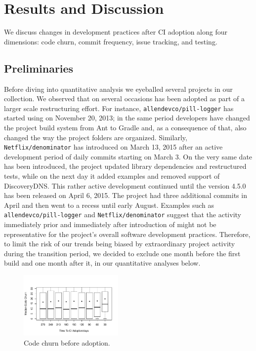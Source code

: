 
\section{Results and Discussion}

We discuss changes in development practices after CI adoption along four 
dimensions: code churn, commit frequency, issue tracking, and testing. 

\subsection{Preliminaries}
\label{sec:examples}

Before diving into quantitative analysis we eyeballed several projects in our 
collection. 
We observed that on several occasions \Tvis has been adopted as part of a 
larger scale restructuring effort. 
For instance, \texttt{allendevco/pill-logger} has started using \Tvis on November 
20, 2013; in the same period developers have changed the project build system 
from Ant to Gradle and, as a consequence of that, also changed the way the 
project folders are organized.
Similarly, \texttt{Netflix/denominator} has introduced \Tvis on March 13, 2015
after an active development period of daily commits starting on March 3.
On the very same date \Tvis has been introduced, the project updated library 
dependencies and restructured tests, while on the next day it added examples 
and removed support of DiscoveryDNS.
This rather active development continued until the version 4.5.0 has been 
released on April 6, 2015.
The project had three additional commits in April and then went to a recess 
until early August. 
Examples such as \texttt{allendevco/pill-logger} and \texttt{Netflix/denominator} 
suggest that the activity immediately prior and immediately after introduction 
of \Tvis might not be representative for the project's overall software development
practices.
Therefore, to limit the risk of our trends being biased by extraordinary project 
activity during the transition period, we decided to exclude one month before 
the first \Tvis build and one month after it, in our quantitative analyses below.

\begin{figure}[t]
\centering
\includegraphics[width=0.45\textwidth, clip=true, trim=0 15 15 50]{churn_before.pdf}
\caption{Code churn before \Tvis adoption.}
\label{Fig:CodeChurnBefore}
\end{figure}


